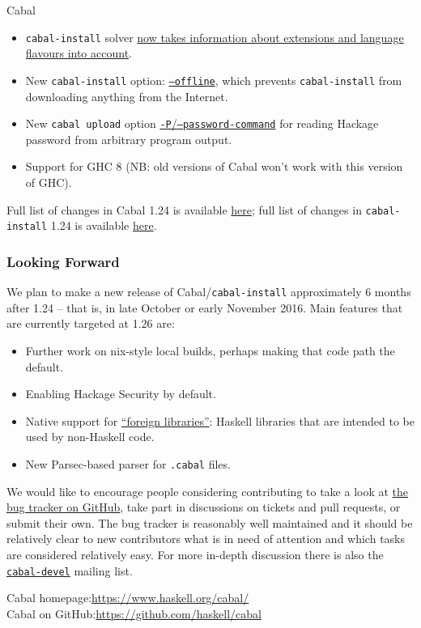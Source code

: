 \documentclass[DIV16,twocolumn,10pt]{scrreprt}
\begin{document}
\begin{hcarentry}{Cabal}
\begin{itemize}
\item \texttt{cabal-install} solver
  \href{https://github.com/haskell/cabal/pull/2873}{now takes information about
    extensions and language flavours into account}.
\item New \texttt{cabal-install} option:
  \href{https://github.com/haskell/cabal/pull/2578}{\texttt{--offline}}, which
  prevents \texttt{cabal-install} from downloading anything from the Internet.
\item New \texttt{cabal upload} option
  \href{https://github.com/haskell/cabal/pull/2506}{\texttt{-P}/\texttt{--password-command}}
  for reading Hackage password from arbitrary program output.
\item Support for GHC 8 (NB: old versions of Cabal won't work with this version
  of GHC).
\end{itemize}

Full list of changes in Cabal 1.24 is available
\href{http://hackage.haskell.org/package/Cabal-1.24.0.0/changelog}{here}; full
list of changes in \texttt{cabal-install} 1.24 is available
\href{http://hackage.haskell.org/package/cabal-install-1.24.0.0/changelog}{here}.

\subsubsection*{Looking Forward}

We plan to make a new release of Cabal/\texttt{cabal-install} approximately 6
months after 1.24 -- that is, in late October or early November 2016. Main
features that are currently targeted at 1.26 are:

\begin{itemize}
\item Further work on nix-style local builds, perhaps making that code path the
  default.
\item Enabling Hackage Security by default.
\item Native support for
  \href{https://github.com/haskell/cabal/pull/2540}{``foreign libraries''}:
  Haskell libraries that are intended to be used by non-Haskell code.
\item New Parsec-based parser for \texttt{.cabal} files.
\end{itemize}

We would like to encourage people considering contributing to take a look at
\href{https://github.com/haskell/cabal/issues/}{the bug tracker on GitHub}, take
part in discussions on tickets and pull requests, or submit their own. The bug
tracker is reasonably well maintained and it should be relatively clear to new
contributors what is in need of attention and which tasks are considered
relatively easy. For more in-depth discussion there is also the
\href{https://mail.haskell.org/mailman/listinfo/cabal-devel}{\texttt{cabal-devel}}
mailing list.

\FurtherReading
  Cabal homepage:\hfill\url{https://www.haskell.org/cabal/}\\
  Cabal on GitHub:\hfill\url{https://github.com/haskell/cabal}

\end{hcarentry}
\end{document}
